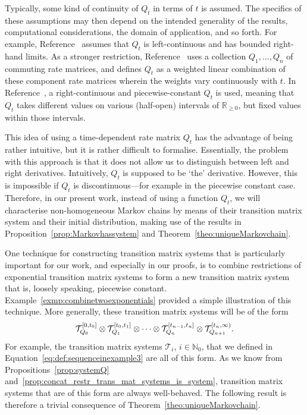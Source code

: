 \documentclass[10pt,a4paper]{paper}
\theoremstyle{definition}
\newcommand{\nats}{\mathbb{N}}
\newcommand{\reals}{\mathbb{R}}
\newcommand{\realsnonneg}{\reals_{\geq 0}}
\begin{document}
Typically, some kind of continuity of $Q_t$ in terms of $t$ is assumed. The specifics of these assumptions may then depend on the intended generality of the results, computational considerations, the domain of application, and so forth. For example, Reference~\cite{aalen1978empirical} assumes that $Q_t$ is left-continuous and has bounded right-hand limits. As a stronger restriction, Reference~\cite{johnson1989nonhomogeneous} uses a collection $Q_1,\ldots,Q_n$ of commuting rate matrices, and defines $Q_t$ as a weighted linear combination of these component rate matrices wherein the weights vary continuously with $t$. In Reference~\cite{rindos1995exact}, a right-continuous and piecewise-constant $Q_t$ is used, meaning that $Q_t$ takes different values on various (half-open) intervals of $\realsnonneg$, but fixed values within those intervals.

This idea of using a time-dependent rate matrix $Q_t$ has the advantage of being rather intuitive, but it is rather difficult to formalise. Essentially, the problem with this approach is that it does not allow us to distinguish between left and right derivatives. Intuitively, $Q_t$ is supposed to be `the' derivative. However, this is impossible if $Q_t$ is discontinuous---for example in the piecewise constant case. Therefore, in our present work, instead of using a function $Q_t$, we will characterise non-homogeneous Markov chains by means of their transition matrix system and their initial distribution, making use of the results in Proposition~\ref{prop:Markovhassystem} and Theorem~\ref{theo:uniqueMarkovchain}.

One technique for constructing transition matrix systems that is particularly important for our work, and especially in our proofs, is to combine restrictions of exponential transition matrix systems to form a new transition matrix system that is, loosely speaking, piecewise constant. Example~\ref{exmp:combinetwoexponentials} provided a simple illustration of this technique. More generally, these transition matrix systems will be of the form
\begin{equation}\label{eq:nonhomogen_in_process_set_system_composition}%
\mathcal{T}_{Q_0}^{[0,t_0]}\otimes \mathcal{T}_{Q_1}^{[t_0,t_1]} \otimes \cdots \otimes \mathcal{T}_{Q_n}^{[t_{n-1},t_n]} \otimes \mathcal{T}_{Q_{n+1}}^{[t_n,\infty)}.
\vspace{4pt}
\end{equation}
For example, the transition matrix systems $\mathcal{T}_i$, $i\in\nats_0$, that we defined in Equation~\eqref{eq:def:sequenceinexample3} are all of this form.
As we know from Propositions~\ref{prop:systemQ} and~\ref{prop:concat_restr_trans_mat_systems_is_system}, transition matrix systems that are of this form are always well-behaved. The following result is therefore a trivial consequence of Theorem~\ref{theo:uniqueMarkovchain}.
\end{document}
